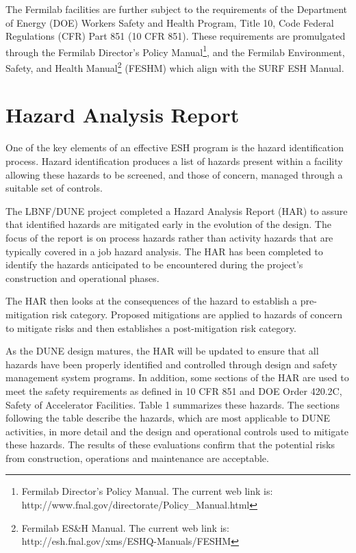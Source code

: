 The Fermilab facilities are further subject to the requirements of the
Department of Energy (DOE) Workers Safety and Health Program, Title
10, Code Federal Regulations (CFR) Part 851 (10 CFR 851).  These
requirements are promulgated through the Fermilab Director's Policy
Manual\footnote{Fermilab Director's Policy Manual. The current web
  link is: http://www.fnal.gov/directorate/Policy\_Manual.html}, and
the Fermilab Environment, Safety, and Health Manual\footnote{Fermilab
  ES\&H Manual. The current web link is:
  http://esh.fnal.gov/xms/ESHQ-Manuals/FESHM} (FESHM) which align with
the SURF ESH Manual.

\section{Hazard Analysis Report}

One of the key elements of an effective ESH program is the hazard
identification process. Hazard identification produces a list of
hazards present within a facility allowing these hazards to be
screened, and those of concern, managed through a suitable set of
controls.

The LBNF/DUNE project completed a Hazard Analysis Report (HAR) to
assure that identified hazards are mitigated early in the evolution of
the design.  The focus of the report is on process hazards rather than
activity hazards that are typically covered in a job hazard analysis.
The HAR has been completed to identify the hazards anticipated to be
encountered during the project's construction and operational phases.

The HAR then looks at the consequences of the hazard to establish a
pre-mitigation risk category. Proposed mitigations are applied to
hazards of concern to mitigate risks and then establishes a
post-mitigation risk category.

As the DUNE design matures, the HAR will be updated to ensure that all
hazards have been properly identified and controlled through design
and safety management system programs.  In addition, some sections of
the HAR are used to meet the safety requirements as defined in 10 CFR
851 and DOE Order 420.2C, Safety of Accelerator Facilities.  Table 1
summarizes these hazards.  The sections following the table describe
the hazards, which are most applicable to DUNE activities, in more
detail and the design and operational controls used to mitigate these
hazards. The results of these evaluations confirm that the potential
risks from construction, operations and maintenance are acceptable.

